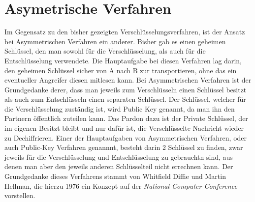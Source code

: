 \documentclass[10pt, a4paper]{scrreprt}
\begin{document}
\section{Asymetrische Verfahren}
Im Gegensatz zu den bisher gezeigten Verschlüsselungsverfahren, ist der Ansatz bei Asymmetrischen Verfahren ein anderer. Bisher gab es einen geheimen Schlüssel, den man sowohl für die Verschlüsselung, als auch für die Entschlüsselung verwendete. Die Hauptaufgabe bei diesen Verfahren lag darin, den geheimen Schlüssel sicher von A nach B zur transportieren, ohne das ein eventueller Angreifer diesen mitlesen kann. Bei Asymmetrischen Verfahren ist der Grundgedanke derer, dass man jeweils zum Verschlüsseln einen Schlüssel besitzt als auch zum Entschlüsseln einen separaten Schlüssel. Der Schlüssel, welcher für die Verschlüsselung zuständig ist, wird Public Key genannt, da man ihn den Partnern öffentlich zuteilen kann. Das Pardon dazu ist der Private Schlüssel, der im eigenen Besitzt bleibt und nur dafür ist, die Verschlüsselte Nachricht wieder zu Dechiffrieren. Einer der Hauptaufgaben von Asymmetrischen Verfahren, oder auch Public-Key Verfahren genannnt, besteht darin 2 Schlüssel zu finden, zwar jeweils für die Verschlüsselung und Entschlüsselung zu gebrauchtn sind, aus denen man aber den jeweils anderen Schlüsselteil nicht errechnen kann. Der Grundgedanke dieses Verfahrens stammt von Whitfield Diffie und Martin Hellman, die hierzu 1976 ein Konzept auf der \textit{National Computer Conference} vorstellen. 
\end{document}
